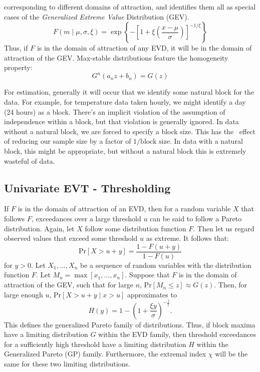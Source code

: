   corresponding to different domains of attraction, and identifies them all as
  special cases of the \emph{Generalized Extreme Value} Distribution (GEV).
\begin{equation*}
  \label{eqn:gev}
  F(m \mid \mu, \sigma, \xi) = \exp\left\lbrace-\left[1 + \xi\left(\frac{x - \mu}{\sigma}\right)\right]^{-1/{\xi}}\right\rbrace
\end{equation*}
Thus, if $F$ is in the domain of attraction of any EVD, it will be in the domain
  of attraction of the GEV.  Max-stable distributions feature the homogeneity
  property:
\begin{equation*}
G^n(a_nz + b_n) = G(z)
\end{equation*}

For estimation, generally it will occur that we identify some natural block for
  the data.  For example, for temperature data taken hourly, we might identify a
  day (24 hours) as a block.  There's an implicit violation of the assumption of
  independence within a block, but that violation is generally ignored.  In data
  without a natural block, we are forced to specify a block size.  This has the \
  effect of reducing our sample size by a factor of $1/\text{block size}$.  In
  data with a natural block, this might be appropriate, but without a natural
  block this is extremely wasteful of data.

\subsection{Univariate EVT - Thresholding}
If $F$ is in the domain of attraction of an EVD, then for a random variable $X$
  that follows $F$, exceedances over a large threshold $u$ can be said to follow
  a Pareto distribution.  Again, let $X$ follow some distribution function $F$.
  Then let us regard observed values that exceed some threshold $u$ as extreme.
  It follows that:
\begin{equation*}
\text{Pr}\left[X > u + y\right] = \frac{1 - F(u + y)}{1 - F(u)}
\end{equation*}
for $y > 0$.  Let $X_1,\ldots,X_n$ be a sequence of random variables with the
  distribution function $F$.  Let $M_n = \max[x_1,\ldots,x_n]$.  Suppose that
  $F$ is in the domain of attraction of the GEV, such that for large $n$,
  $\text{Pr}[M_n \leq z]\approx G(z)$.  Then, for large enough $u$,
  $\text{Pr}[X > u+y\mid x > u]$ approximates to
\begin{equation*}
  \label{eqn:gp}
H(y) = 1 - \left(1 + \frac{\xi y}{\sigma}\right)^{-\frac{1}{\xi}}.
\end{equation*}
This defines the generalized Pareto family of distributions.  Thus, if block
  maxima have a limiting distribution $G$ within the EVD family, then threshold
  exceedances for a sufficiently high threshold have a limiting distribution $H$
  within the Generalized Pareto (GP) family.  Furthermore, the extremal index $\chi$
  will be the same for these two limiting distributions.

